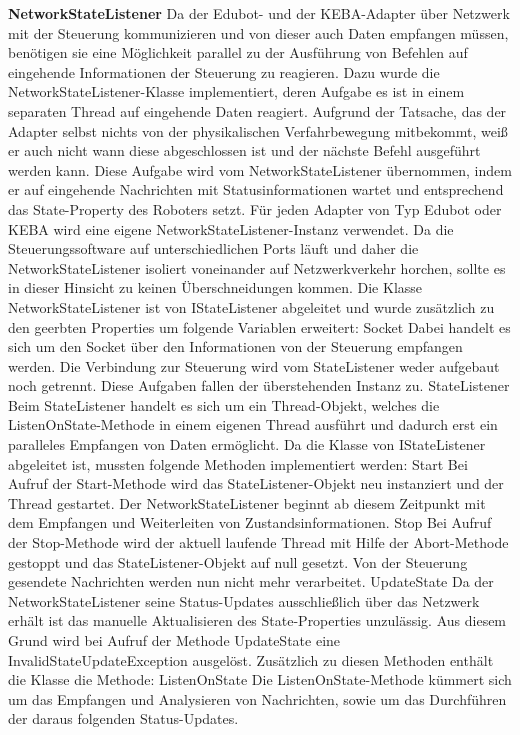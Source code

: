\textbf{NetworkStateListener}
Da der Edubot- und der KEBA-Adapter über Netzwerk mit der Steuerung kommunizieren und von dieser auch Daten empfangen müssen, benötigen sie eine Möglichkeit parallel zu der Ausführung von Befehlen auf eingehende Informationen der Steuerung zu reagieren. 
Dazu wurde die NetworkStateListener-Klasse implementiert, deren Aufgabe es ist in einem separaten Thread auf eingehende Daten reagiert. Aufgrund der Tatsache, das der Adapter selbst nichts von der physikalischen Verfahrbewegung mitbekommt, weiß er auch nicht wann diese abgeschlossen ist und der nächste Befehl ausgeführt werden kann. Diese Aufgabe wird vom NetworkStateListener übernommen, indem er auf eingehende Nachrichten mit Statusinformationen wartet und entsprechend das State-Property des Roboters setzt.
Für jeden Adapter von Typ Edubot oder KEBA wird eine eigene NetworkStateListener-Instanz verwendet. Da die Steuerungssoftware auf unterschiedlichen Ports läuft und daher die NetworkStateListener isoliert voneinander auf Netzwerkverkehr horchen, sollte es in dieser Hinsicht zu keinen Überschneidungen kommen.
Die Klasse NetworkStateListener ist von IStateListener abgeleitet und wurde zusätzlich zu den geerbten Properties um folgende Variablen erweitert:
Socket
Dabei handelt es sich um den Socket über den Informationen von der Steuerung empfangen werden. Die Verbindung zur Steuerung wird vom StateListener weder aufgebaut noch getrennt. Diese Aufgaben fallen der überstehenden Instanz zu.
StateListener
Beim StateListener handelt es sich um ein Thread-Objekt, welches die ListenOnState-Methode in einem eigenen Thread ausführt und dadurch erst ein paralleles Empfangen von Daten ermöglicht.
Da die Klasse von IStateListener abgeleitet ist, mussten folgende Methoden implementiert werden:
Start
Bei Aufruf der Start-Methode wird das StateListener-Objekt neu instanziert und der Thread gestartet. Der NetworkStateListener beginnt ab diesem Zeitpunkt mit dem Empfangen und Weiterleiten von Zustandsinformationen. 
Stop
Bei Aufruf der Stop-Methode wird der aktuell laufende Thread mit Hilfe der Abort-Methode gestoppt und das StateListener-Objekt auf null gesetzt. Von der Steuerung gesendete Nachrichten werden nun nicht mehr verarbeitet.
UpdateState
Da der NetworkStateListener seine Status-Updates ausschließlich über das Netzwerk erhält ist das manuelle Aktualisieren des State-Properties unzulässig. Aus diesem Grund wird bei Aufruf der Methode UpdateState eine InvalidStateUpdateException ausgelöst.
Zusätzlich zu diesen Methoden enthält die Klasse die Methode:
ListenOnState
Die ListenOnState-Methode kümmert sich um das Empfangen und Analysieren von Nachrichten, sowie um das Durchführen der daraus folgenden Status-Updates. 
